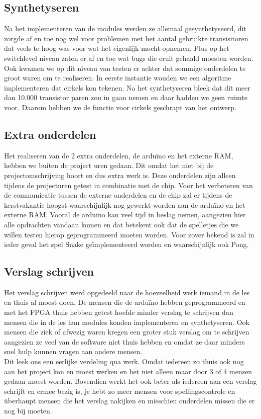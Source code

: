 \documentclass{scrartcl} %
\begin{document}
\subsection{Synthetyseren}

Na het implementeren van de modules werden ze allemaal gesynthetyseerd, dit zorgde af en toe nog wel voor problemen met het aantal gebruikte transisitoren dat veels te hoog was voor wat het eigenlijk mocht opnemen. Plus op het switchlevel niveau zaten er af en toe 
wat bugs die eruit gehaald moesten worden. Ook kwamen we op dit niveau van testen er achter dat sommige onderdelen te groot waren om te realiseren. In eerste instantie wouden we een algoritme implementeren dat cirkels kon tekenen. Na het synthetyseren bleek dat dit 
meer dan 10.000 transistor paren zou in gaan nemen en daar hadden we geen ruimte voor. Daarom hebben we de functie voor cirkels geschrapt van het ontwerp.


\subsection{Extra onderdelen}

Het realiseren van de 2 extra onderdelen, de arduïno en het externe RAM, hebben we buiten de project uren gedaan. Dit omdat het niet bij de projectomschrijving hoort en dus extra werk is. Deze onderdelen zijn alleen tijdens de projecturen getest in combinatie met de chip. Voor het verbeteren van de communicatie tussen de externe onderdelen en de chip zal er tijdens de kerstvakantie hoogst waarschijnlijk nog gewerkt worden aan de arduïno en het externe RAM. Vooral de arduïno kan veel tijd in beslag nemen, aangezien hier alle opdrachten vandaan komen en dat betekent ook dat de spelletjes die we willen testen hierop geprogrammeerd moeten worden. Voor zover bekend is zal in ieder geval het spel Snake geïmplementeerd worden en waarschijnlijk ook Pong.

\subsection{Verslag schrijven}

Het verslag schrijven werd opgedeeld naar de hoeveelheid werk iemand in de les en thuis al moest doen. De mensen die de arduïno hebben geprogrammeerd en met het FPGA thuis hebben getest hoefde minder verslag te schrijven dan mensen die in de les hun modules konden
implementeren en synthetyseren. Ook mensen die ziek of afwezig waren kregen een groter stuk verslag om te schrijven aangezien ze veel van de software niet thuis hebben en omdat ze daar minders snel hulp kunnen vragen aan andere mensen.\\
Dit leek ons een eerlijke verdeling qua werk. Omdat iedereen zo thuis ook nog aan het project kon en moest werken en het niet alleen maar door 3 of 4 mensen gedaan moest worden. Bovendien werkt het ook beter als iedereen aan een verslag schrijft en ermee bezig is, je hebt zo meer mensen voor spellingscontrole en überhaupt mensen die het verslag nakijken en misschien onderdelen missen die er nog bij moeten.
\end{document}
